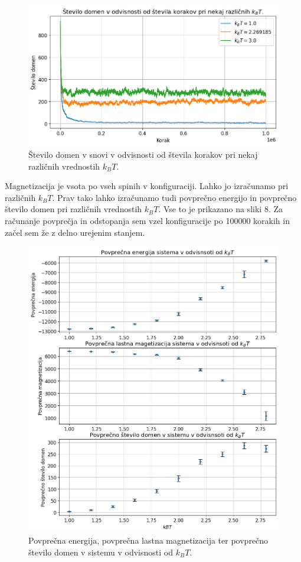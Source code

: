 \documentclass[slovene,11pt,a4paper]{article}
\begin{document}
\begin{figure}[h!]
\centering
\includegraphics[width=\linewidth]{ising3.png}
\caption{Število domen v snovi v odvisnosti od števila korakov pri nekaj različnih vrednostih $k_BT$.}
\end{figure}

Magnetizacija je vsota po vseh spinih v konfiguraciji. Lahko jo izračunamo pri različnih $k_BT$. Prav tako lahko izračunamo tudi povprečno energijo in povprečno število domen pri različnih vrednostih $k_BT$. Vse to je prikazano na sliki 8. Za računanje povprečja in odstopanja sem vzel konfiguracije po 100000 korakih in začel sem že z delno urejenim stanjem.

\begin{figure}[h!]
\centering
\includegraphics[width=\linewidth]{ising4.png}
\caption{Povprečna energija, povprečna lastna magnetizacija ter povprečno število domen v sistemu v odvisnosti od $k_BT$.}
\end{figure}
\end{document}
